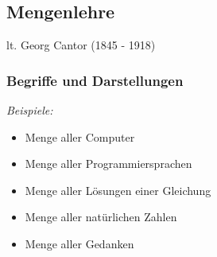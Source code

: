              
    \subsection{Mengenlehre}
        lt. Georg Cantor (1845 - 1918)
            \subsubsection{Begriffe und Darstellungen}
                 

                \textit{Beispiele:}
                    \begin{itemize}[leftmargin=*]
                        \item Menge aller Computer
                        \item Menge aller Programmiersprachen
                        \item Menge aller Lösungen einer Gleichung
                        \item Menge aller natürlichen Zahlen
                        \item Menge aller Gedanken
                    \end{itemize}

